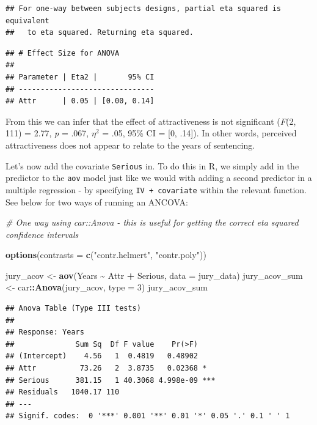 \documentclass[
]{book}
\newenvironment{Shaded}{\begin{snugshade}}{\end{snugshade}}
\newcommand{\AttributeTok}[1]{\textcolor[rgb]{0.13,0.29,0.53}{#1}}
\newcommand{\CommentTok}[1]{\textcolor[rgb]{0.56,0.35,0.01}{\textit{#1}}}
\newcommand{\DecValTok}[1]{\textcolor[rgb]{0.00,0.00,0.81}{#1}}
\newcommand{\FunctionTok}[1]{\textcolor[rgb]{0.13,0.29,0.53}{\textbf{#1}}}
\newcommand{\NormalTok}[1]{#1}
\newcommand{\OtherTok}[1]{\textcolor[rgb]{0.56,0.35,0.01}{#1}}
\newcommand{\SpecialCharTok}[1]{\textcolor[rgb]{0.81,0.36,0.00}{\textbf{#1}}}
\newcommand{\StringTok}[1]{\textcolor[rgb]{0.31,0.60,0.02}{#1}}
\begin{document}
\begin{verbatim}
## For one-way between subjects designs, partial eta squared is equivalent
##   to eta squared. Returning eta squared.
\end{verbatim}

\begin{verbatim}
## # Effect Size for ANOVA
## 
## Parameter | Eta2 |       95% CI
## -------------------------------
## Attr      | 0.05 | [0.00, 0.14]
\end{verbatim}

From this we can infer that the effect of attractiveness is not significant (\emph{F}(2, 111) = 2.77, \emph{p} = .067, \(\eta^2\) = .05, 95\% CI = {[}0, .14{]}). In other words, perceived attractiveness does not appear to relate to the years of sentencing.

Let's now add the covariate \texttt{Serious} in. To do this in R, we simply add in the predictor to the \texttt{aov} model just like we would with adding a second predictor in a multiple regression - by specifying \texttt{IV\ +\ covariate} within the relevant function. See below for two ways of running an ANCOVA:

\begin{Shaded}
\begin{Highlighting}[]
\CommentTok{\# One way using car::Anova {-} this is useful for getting the correct eta squared confidence intervals}

\FunctionTok{options}\NormalTok{(}\AttributeTok{contrasts =} \FunctionTok{c}\NormalTok{(}\StringTok{"contr.helmert"}\NormalTok{, }\StringTok{"contr.poly"}\NormalTok{))}

\NormalTok{jury\_acov }\OtherTok{\textless{}{-}} \FunctionTok{aov}\NormalTok{(Years }\SpecialCharTok{\textasciitilde{}}\NormalTok{ Attr }\SpecialCharTok{+}\NormalTok{ Serious, }\AttributeTok{data =}\NormalTok{ jury\_data)}
\NormalTok{jury\_acov\_sum }\OtherTok{\textless{}{-}}\NormalTok{ car}\SpecialCharTok{::}\FunctionTok{Anova}\NormalTok{(jury\_acov, }\AttributeTok{type =} \DecValTok{3}\NormalTok{)}
\NormalTok{jury\_acov\_sum}
\end{Highlighting}
\end{Shaded}

\begin{verbatim}
## Anova Table (Type III tests)
## 
## Response: Years
##              Sum Sq  Df F value    Pr(>F)    
## (Intercept)    4.56   1  0.4819   0.48902    
## Attr          73.26   2  3.8735   0.02368 *  
## Serious      381.15   1 40.3068 4.998e-09 ***
## Residuals   1040.17 110                      
## ---
## Signif. codes:  0 '***' 0.001 '**' 0.01 '*' 0.05 '.' 0.1 ' ' 1
\end{verbatim}
\end{document}
